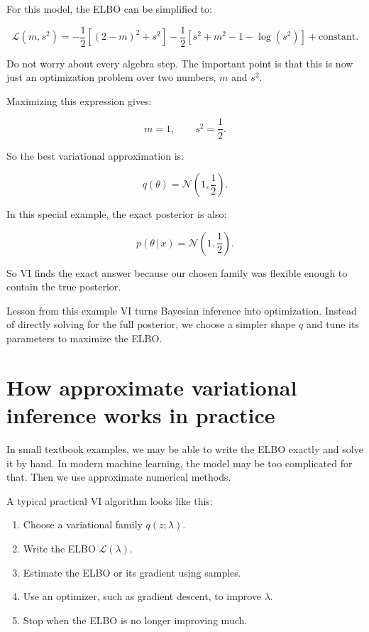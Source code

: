 \documentclass[11pt]{article}
\newcommand{\given}{\,|\,}
\begin{document}
For this model, the ELBO can be simplified to:

\begin{equation}
\mathcal{L}(m,s^2)
= -\frac{1}{2}\left[(2-m)^2+s^2\right]
  -\frac{1}{2}\left[s^2+m^2-1-\log(s^2)\right]
  + \text{constant}.
\end{equation}

Do not worry about every algebra step. The important point is that this is now just an optimization problem over two numbers, $m$ and $s^2$.

Maximizing this expression gives:

\[
\boxed{m=1, \qquad s^2=\frac{1}{2}.}
\]

So the best variational approximation is:

\[
q(\theta)=\mathcal{N}\left(1,\frac{1}{2}\right).
\]

In this special example, the exact posterior is also:

\[
p(\theta\given x)=\mathcal{N}\left(1,\frac{1}{2}\right).
\]

So VI finds the exact answer because our chosen family was flexible enough to contain the true posterior.

\begin{examplebox}{Lesson from this example}
VI turns Bayesian inference into optimization. Instead of directly solving for the full posterior, we choose a simpler shape $q$ and tune its parameters to maximize the ELBO.
\end{examplebox}

\section{How approximate variational inference works in practice}

In small textbook examples, we may be able to write the ELBO exactly and solve it by hand.
In modern machine learning, the model may be too complicated for that.
Then we use approximate numerical methods.

A typical practical VI algorithm looks like this:

\begin{enumerate}[leftmargin=*]
  \item Choose a variational family $q(z;\lambda)$.
  \item Write the ELBO $\mathcal{L}(\lambda)$.
  \item Estimate the ELBO or its gradient using samples.
  \item Use an optimizer, such as gradient descent, to improve $\lambda$.
  \item Stop when the ELBO is no longer improving much.
\end{enumerate}
\end{document}
